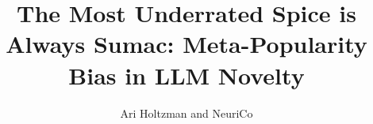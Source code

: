 \documentclass{article}
\title{The Most Underrated Spice is Always Sumac: Meta-Popularity Bias in LLM Novelty}
\author{Ari Holtzman and NeuriCo}
\begin{document}
\maketitle

\begin{abstract}

\end{abstract}










\end{document}
